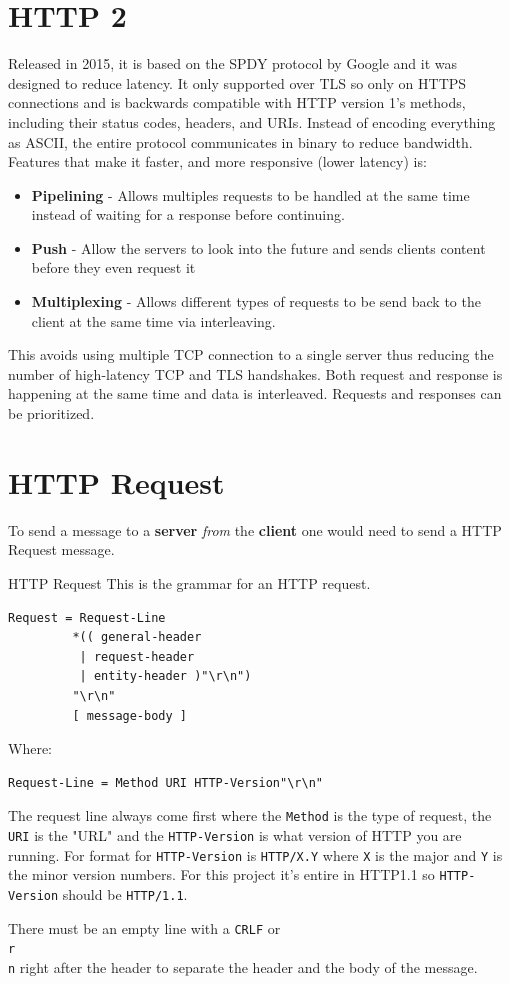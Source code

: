 \documentclass[../CMPUT-404-Notes.tex]{subfiles}
\begin{document}
\section{HTTP 2}
Released in 2015, it is based on the SPDY protocol by Google and it was designed to reduce latency. 
It only supported over TLS so only on HTTPS connections and is backwards compatible with HTTP version 1's methods, including their status codes, headers, and URIs.
Instead of encoding everything as ASCII, the entire protocol communicates in binary to reduce bandwidth. 
Features that make it faster, and more responsive (lower latency) is:
\begin{itemize}
  \item \textbf{Pipelining} - Allows multiples requests to be handled at the same time instead of waiting for a response before continuing. 
  \item \textbf{Push} - Allow the servers to look into the future and sends clients content before they even request it 
  \item \textbf{Multiplexing} - Allows different types of requests to be send back to the client at the same time via interleaving.
\end{itemize}

This avoids using multiple TCP connection to a single server thus reducing the number of high-latency TCP and TLS handshakes.
Both request and response is happening at the same time and data is interleaved. Requests and responses can be prioritized.

\section{HTTP Request}
To send a message to a \textbf{server} \emph{from} the \textbf{client} one would need to send a HTTP Request message.
\newpage

\begin{Definition}{HTTP Request}
This is the grammar for an HTTP request.
\begin{verbatim}
Request = Request-Line              
         *(( general-header        
          | request-header         
          | entity-header )"\r\n")  
         "\r\n"
         [ message-body ]          
\end{verbatim}
Where: 
\begin{verbatim}
Request-Line = Method URI HTTP-Version"\r\n"  
\end{verbatim}
The request line always come first where the \texttt{Method} is the type of request, the \texttt{URI} is the "URL" and the \texttt{HTTP-Version} is what version of HTTP you are running.
For format for \texttt{HTTP-Version} is \texttt{HTTP/X.Y} where \texttt{X} is the major and \texttt{Y} is the minor version numbers.
For this project it's entire in HTTP1.1 so \texttt{HTTP-Version} should be \texttt{HTTP/1.1}.

There must be an empty line with a \texttt{CRLF} or \texttt{\\r\\n} right after the header to separate the header and the body of the message.
\end{Definition}
\end{document}
